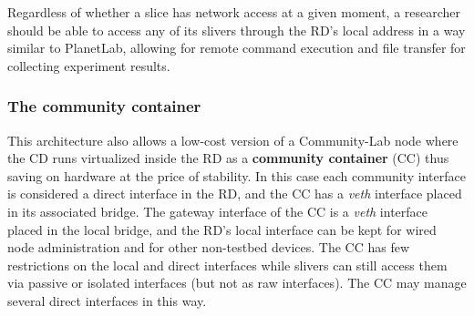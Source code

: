 \documentclass[conference]{IEEEtran}
\begin{document}
Regardless of whether a slice has network access at a given moment, a
researcher should be able to access any of its slivers through the RD's local address in a
way similar to PlanetLab, allowing for remote
command execution and file transfer for collecting experiment results.


\subsubsection{The community container}

This architecture also allows a low-cost version of a Community-Lab node where the CD runs virtualized inside the
RD as a \textbf{community container} (CC) thus saving on hardware at the price
of stability.  In this case each community interface is considered a direct
interface in the RD, and the CC has a \emph{veth} interface placed in its
associated bridge.  The gateway interface of the CC is a \emph{veth} interface
placed in the local bridge, and the RD's local interface can be kept for wired
node administration and for other non-testbed devices.  The CC has few
restrictions on the local and direct interfaces while slivers can still access
them via passive or isolated interfaces (but not as raw interfaces).  The CC
may manage several direct interfaces in this way.
\end{document}
